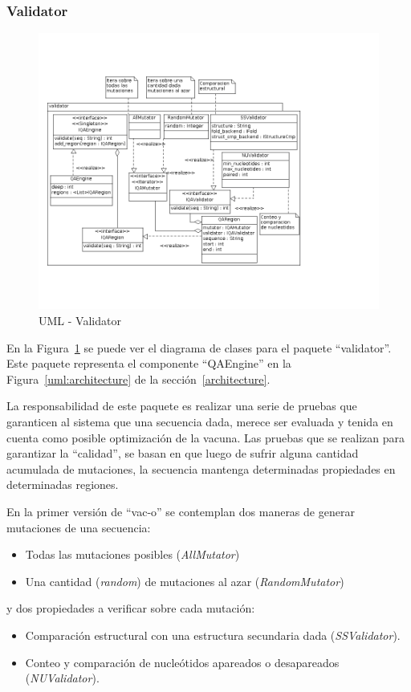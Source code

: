   \subsubsection{Validator}
    \begin{figure}
      \centering
      \includegraphics[scale=0.5]{lld-validator.png}  
      \caption{UML - Validator}
      \label{uml:lld-validator}
    \end{figure}

  En la Figura~\ref{uml:lld-validator} se puede ver el diagrama de clases
para el paquete ``validator''. Este paquete representa el componente
``QAEngine'' en la Figura~\ref{uml:architecture} de la
secci\'on~\ref{architecture}.

  La responsabilidad de este paquete es realizar una serie de pruebas que
garanticen al sistema que una secuencia dada, merece ser evaluada y tenida en
cuenta como posible optimizaci\'on de la vacuna. Las pruebas que se realizan
para garantizar la ``calidad'', se basan en que luego de sufrir alguna cantidad
acumulada de mutaciones, la secuencia mantenga determinadas propiedades en
determinadas regiones.

  En la primer versi\'on de ``vac-o'' se contemplan dos maneras de generar
mutaciones de una secuencia:
    \begin{itemize}
     \item Todas las mutaciones posibles (\textit{AllMutator})
     \item Una cantidad (\textit{random}) de mutaciones al azar
(\textit{RandomMutator})
    \end{itemize}
y dos propiedades a verificar sobre cada mutaci\'on:
    \begin{itemize}
     \item Comparaci\'on estructural con una estructura secundaria dada
(\textit{SSValidator}).
     \item Conteo y comparaci\'on de nucle\'otidos apareados o desapareados
(\textit{NUValidator}).
    \end{itemize}

